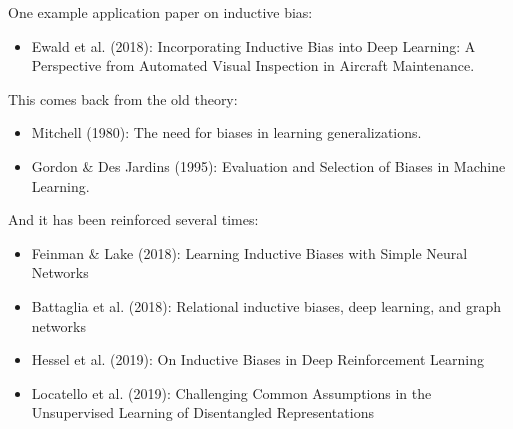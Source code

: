 \documentclass[11pt,a4paper]{article}
\begin{document}
{{{{{	One example application paper on inductive bias:
	\begin{itemize}
		\item Ewald et al. (2018): Incorporating Inductive Bias into Deep Learning: A Perspective from Automated Visual Inspection in Aircraft Maintenance.
	\end{itemize}

	This comes back from the old theory:
	\begin{itemize}
	\item Mitchell (1980): The need for biases in learning generalizations.
	\item Gordon \& Des Jardins (1995): Evaluation and Selection of Biases in Machine Learning.
	\end{itemize}

	And it has been reinforced several times:
	\begin{itemize}
	\item Feinman \& Lake (2018): Learning Inductive Biases with Simple Neural Networks
	\item Battaglia et al. (2018): Relational inductive biases, deep learning, and graph networks
	\item Hessel et al. (2019): On Inductive Biases in Deep Reinforcement Learning
	\item Locatello et al. (2019): Challenging Common Assumptions in the Unsupervised Learning of Disentangled Representations
	\end{itemize}
	}}}}}
\end{document}

